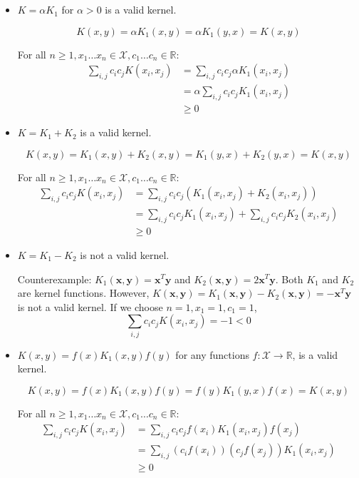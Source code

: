 \documentclass{article}[11pt]
\begin{document}
\section{}
\begin{itemize}
\item $K=\alpha K_1$ for $\alpha > 0$ is a valid kernel.

\[ K(x, y) = \alpha K_1(x, y) = \alpha K_1(y, x) = K(x, y) \]

For all $n \ge 1, x_1 \dots x_n \in \mathcal{X}, c_1 \dots c_n \in \mathbb{R}$:
\begin{align*}
  \sum_{i,j} c_i c_j K(x_i, x_j) & = \sum_{i,j} c_i c_j \alpha K_1(x_i, x_j) \\
   & = \alpha \sum_{i,j} c_i c_j K_1(x_i, x_j) \\
   & \ge 0
\end{align*}

\item $K= K_1 + K_2$ is a valid kernel.

\[ K(x, y) = K_1(x, y) + K_2(x, y) = K_1(y, x) + K_2(y, x) = K(x, y) \]

For all $n \ge 1, x_1 \dots x_n \in \mathcal{X}, c_1 \dots c_n \in \mathbb{R}$:
\begin{align*}
  \sum_{i,j} c_i c_j K(x_i, x_j) & = \sum_{i,j} c_i c_j (K_1(x_i, x_j) + K_2(x_i, x_j)) \\
   & = \sum_{i,j} c_i c_j K_1(x_i, x_j) + \sum_{i,j} c_i c_j K_2(x_i, x_j) \\
   & \ge 0
\end{align*}

\item $K= K_1 - K_2$ is not a valid kernel.

  Counterexample: $K_1(\mathbf{x}, \mathbf{y}) = \mathbf{x}^T\mathbf{y}$ and $K_2(\mathbf{x}, \mathbf{y}) = 2\mathbf{x}^T\mathbf{y}$. Both $K_1$ and $K_2$ are kernel functions. However, $K(\mathbf{x}, \mathbf{y}) = K_1(\mathbf{x}, \mathbf{y}) - K_2(\mathbf{x}, \mathbf{y}) = -\mathbf{x}^T\mathbf{y}$ is not a valid kernel. If we choose $n = 1, x_1 = 1, c_1 = 1$,
  \[ \sum_{i,j} c_i c_j K(x_i, x_j) = -1 < 0 \]

\item $K(x,y) =f(x)K_1(x,y)f(y)$ for any functions $f : \mathcal{X} \rightarrow \mathbb{R}$, is a valid kernel.

\[ K(x, y) = f(x)K_1(x,y)f(y) = f(y)K_1(y,x)f(x) = K(x, y) \]

For all $n \ge 1, x_1 \dots x_n \in \mathcal{X}, c_1 \dots c_n \in \mathbb{R}$:
\begin{align*}
  \sum_{i,j} c_i c_j K(x_i, x_j) & = \sum_{i,j} c_i c_j f(x_i) K_1(x_i, x_j) f(x_j) \\
   & = \sum_{i,j} (c_i f(x_i)) (c_j f(x_j)) K_1(x_i, x_j) \\
   & \ge 0
\end{align*}

\end{itemize}
\end{document}
